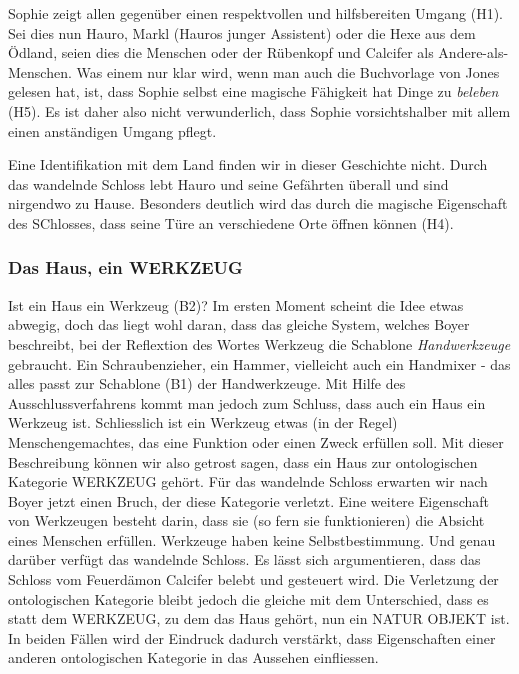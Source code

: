 Sophie zeigt allen gegenüber einen respektvollen und hilfsbereiten Umgang (H1). Sei dies nun Hauro, Markl (Hauros junger Assistent) oder die Hexe aus dem Ödland,  seien dies die Menschen oder der Rübenkopf und Calcifer als Andere-als-Menschen. Was einem nur klar wird, wenn man auch die Buchvorlage von Jones gelesen hat, ist, dass Sophie selbst eine magische Fähigkeit hat Dinge zu \emph{beleben} (H5). Es ist daher also nicht verwunderlich, dass Sophie vorsichtshalber mit allem einen anständigen Umgang pflegt.

Eine Identifikation mit dem Land finden wir in dieser Geschichte nicht. Durch das wandelnde Schloss lebt Hauro und seine Gefährten überall und sind nirgendwo zu Hause. Besonders deutlich wird das durch die magische Eigenschaft des SChlosses, dass seine Türe an verschiedene Orte öffnen können (H4).

\subsubsection{Das Haus, ein WERKZEUG} 
Ist ein Haus ein Werkzeug (B2)? Im ersten Moment scheint die Idee etwas abwegig, doch das liegt wohl daran, dass das gleiche System, welches Boyer beschreibt, bei der Reflextion des Wortes Werkzeug die Schablone \emph{Handwerkzeuge} gebraucht. Ein Schraubenzieher, ein Hammer, vielleicht auch ein Handmixer - das alles passt zur Schablone (B1) der Handwerkzeuge. Mit Hilfe des Ausschlussverfahrens kommt man jedoch zum Schluss, dass auch ein Haus ein Werkzeug ist. Schliesslich ist ein Werkzeug etwas (in der Regel) Menschengemachtes, das eine Funktion oder einen Zweck erfüllen soll. Mit dieser Beschreibung können wir also getrost sagen, dass ein Haus zur ontologischen Kategorie WERKZEUG gehört. Für das wandelnde Schloss erwarten wir nach Boyer jetzt einen Bruch, der diese Kategorie verletzt. Eine weitere Eigenschaft von Werkzeugen besteht darin, dass sie (so fern sie funktionieren) die Absicht eines Menschen erfüllen. Werkzeuge haben keine Selbstbestimmung. Und genau darüber verfügt das wandelnde Schloss. Es lässt sich argumentieren, dass das Schloss vom Feuerdämon Calcifer belebt und gesteuert wird. Die Verletzung der ontologischen Kategorie bleibt jedoch die gleiche mit dem Unterschied, dass es statt dem WERKZEUG, zu dem das Haus gehört, nun ein NATUR OBJEKT ist. In beiden Fällen wird der Eindruck dadurch verstärkt, dass Eigenschaften einer anderen ontologischen Kategorie in das Aussehen einfliessen. 

